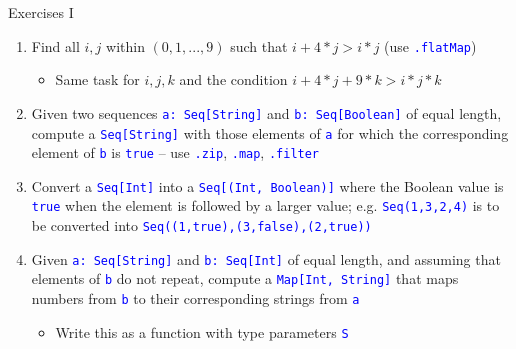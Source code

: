 \documentclass[english]{beamer}
\begin{document}
\begin{frame}{Exercises I}

\begin{enumerate}
\item Find all $i,j$ within $\left(0,1,...,9\right)$ such that $i+4*j>i*j$
(use \texttt{\textcolor{blue}{\footnotesize{}.flatMap}})
\begin{itemize}
\item Same task for $i,j,k$ and the condition $i+4*j+9*k>i*j*k$
\end{itemize}
\item Given two sequences \texttt{\textcolor{blue}{\footnotesize{}a:}}~\texttt{\textcolor{blue}{\footnotesize{}Seq{[}String{]}}}
and \texttt{\textcolor{blue}{\footnotesize{}b:}}~\texttt{\textcolor{blue}{\footnotesize{}Seq{[}Boolean{]}}}
of equal length, compute a \texttt{\textcolor{blue}{\footnotesize{}Seq{[}String{]}}}
with those elements of \texttt{\textcolor{blue}{\footnotesize{}a}}
for which the corresponding element of \texttt{\textcolor{blue}{\footnotesize{}b}}
is \texttt{\textcolor{blue}{\footnotesize{}true}} -- use \texttt{\textcolor{blue}{\footnotesize{}.zip}},
\texttt{\textcolor{blue}{\footnotesize{}.map}}, \texttt{\textcolor{blue}{\footnotesize{}.filter}}{\footnotesize\par}
\item Convert a \texttt{\textcolor{blue}{\footnotesize{}Seq{[}Int{]}}} into
a \texttt{\textcolor{blue}{\footnotesize{}Seq{[}(Int, Boolean){]}}}
where the Boolean value is \texttt{\textcolor{blue}{\footnotesize{}true}}
when the element is followed by a larger value; e.g. \texttt{\textcolor{blue}{\footnotesize{}Seq(1,3,2,4)}}
is to be converted into \texttt{\textcolor{blue}{\footnotesize{}Seq((1,true),(3,false),(2,true))}}{\footnotesize\par}
\item Given \texttt{\textcolor{blue}{\footnotesize{}a:}}~\texttt{\textcolor{blue}{\footnotesize{}Seq{[}String{]}}}
and \texttt{\textcolor{blue}{\footnotesize{}b:}}~\texttt{\textcolor{blue}{\footnotesize{}Seq{[}Int{]}}}
of equal length, and assuming that elements of \texttt{\textcolor{blue}{\footnotesize{}b}}
do not repeat, compute a \texttt{\textcolor{blue}{\footnotesize{}Map{[}Int,
String{]}}} that maps numbers from \texttt{\textcolor{blue}{\footnotesize{}b}}
to their corresponding strings from \texttt{\textcolor{blue}{\footnotesize{}a}}{\footnotesize\par}
\begin{itemize}
\item Write this as a function with type parameters \texttt{\textcolor{blue}{\footnotesize{}S}}

\end{itemize}
\end{enumerate}
\end{frame}
\end{document}
